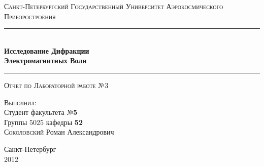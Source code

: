 \documentclass[10pt,a4paper,oneside, reqno]{amsproc}
\author{Соколовский Роман}
\begin{document}
\begin{titlepage}
    \begin{center}
        \textsc{\large Санкт-Петербургский Государственный Университет Аэрокосмического Приборостроения}\\[5cm]
        \rule{\textwidth}{1pt}\\
        \vspace{10pt}
        { \huge \bfseries Исследование Дифракции \\[0.2cm]
        Электромагнитных Волн}\\[0.4cm]
        \hrule
        \vspace{0.4cm}
        \textsc{ {\large Отчет по Лабораторной работе №3}}
        
        \vspace{2.5cm}
        \begin{flushright}
        \begin{minipage}{0.5\textwidth}
            \begin{flushright} 
                \textsc{\small Выполнил}:\\
                \large
                Студент факультета №\textbf{5}\\
                Группы \textbf{$5025$} кафедры \textbf{52}\\[2pt]
                \textsc{Соколовский} \textsc{Р}оман \textsc{А}лександрович
            \end{flushright}
        \end{minipage}
        \end{flushright}
        \vfill
        {\large Санкт-Петербург\\2012}
    \end{center}
\end{titlepage}
\end{document}
